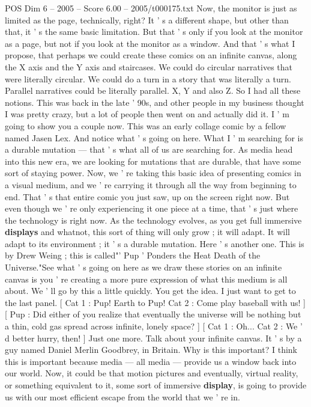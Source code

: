 \begin{textsample}{POS Dim 6 – 2005 – Score 6.00 – 2005/t000175.txt}
Now, the monitor is just as limited as the page, technically, right?
It ' s a different shape, but other than that, it ' s the same basic limitation.
But that ' s only if you look at the monitor as a page, but not if you look at the monitor as a window.
And that ' s what I propose, that perhaps we could create these comics on an infinite canvas, along the X axis and the Y axis and staircases.
We could do circular narratives that were literally circular.
We could do a turn in a story that was literally a turn.
Parallel narratives could be literally parallel.
X, Y and also Z.
So I had all these notions.
This was back in the late ' 90s, and other people in my business thought I was pretty crazy, but a lot of people then went on and actually did it.
I ' m going to show you a couple now.
This was an early collage comic by a fellow named Jasen Lex.
And notice what ' s going on here.
What I ' m searching for is a durable mutation — that ' s what all of us are searching for.
As media head into this new era, we are looking for mutations that are durable, that have some sort of staying power.
Now, we ' re taking this basic idea of presenting comics in a visual medium, and we ' re carrying it through all the way from beginning to end.
That ' s that entire comic you just saw, up on the screen right now.
But even though we ' re only experiencing it one piece at a time, that ' s just where the technology is right now.
As the technology evolves, as you get full immersive \textbf{displays} and whatnot, this sort of thing will only grow ; it will adapt.
It will adapt to its environment ; it ' s a durable mutation.
Here ' s another one.
This is by Drew Weing ; this is called"' Pup ' Ponders the Heat Death of the Universe."See what ' s going on here as we draw these stories on an infinite canvas is you ' re creating a more pure expression of what this medium is all about.
We ' ll go by this a little quickly.
You get the idea.
I just want to get to the last panel. [ Cat 1 : Pup!
Earth to Pup!
Cat 2 : Come play baseball with us! ] [ Pup : Did either of you realize that eventually the universe will be nothing but a thin, cold gas spread across infinite, lonely space? ] [ Cat 1 : Oh...
Cat 2 : We ' d better hurry, then! ] Just one more.
Talk about your infinite canvas.
It ' s by a guy named Daniel Merlin Goodbrey, in Britain.
Why is this important?
I think this is important because media — all media — provide us a window back into our world.
Now, it could be that motion pictures and eventually, virtual reality, or something equivalent to it, some sort of immersive \textbf{display}, is going to provide us with our most efficient escape from the world that we ' re in.

\end{textsample}
